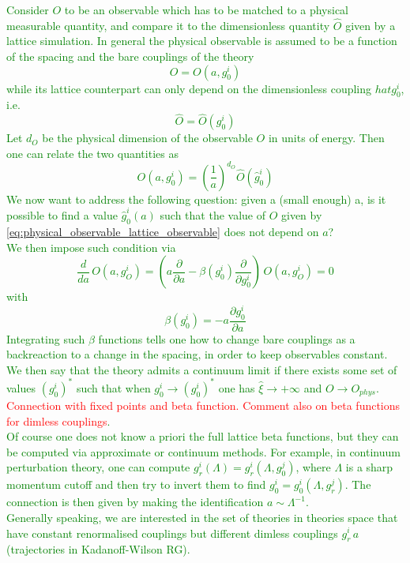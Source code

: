 \textcolor{green}{Consider $O$ to be an observable which has to be matched to a physical measurable quantity, and compare it to the dimensionless quantity $\hat O$ given by a lattice simulation. In general the physical observable is assumed to be a function of the spacing and the bare couplings of the theory 
\begin{equation*}
    O = O(a, g^i_0)
\end{equation*}
while its lattice counterpart can only depend on the dimensionless coupling $hat g_0^i$, i.e.
\begin{equation*}
    \hat O = \hat O(g_0^i)
\end{equation*}
Let $d_O$ be the physical dimension of the observable $O$ in units of energy. Then one can relate the two quantities as 
\begin{equation}
    O(a, g^i_0) = \left(\frac{1}{a}\right)^{d_O} \hat O(\hat g_0^i)
    \label{eq:physical_observable_lattice_observable}
\end{equation}
We now want to address the following question: given a (small enough) a, is it possible to find a value $\hat g_0^i(a)$ such that the value of $O$ given by \eqref{eq:physical_observable_lattice_observable} does not depend on $a$? \\
We then impose such condition via 
\begin{equation*}
    \frac{d}{da} \, O(a, g^i_O) = \left(a\frac{\partial}{\partial a} - \beta(g_0^i) \frac{\partial}{\partial g_0^i}\right) \, O(a, g^i_O) = 0
\end{equation*}
with
\begin{equation*}
    \beta(g_0^i) = - a \frac{\partial g_0^i}{\partial a}
\end{equation*}
Integrating such $\beta$ functions tells one how to change bare couplings as a backreaction to a change in the spacing, in order to keep observables constant. We then say that the theory admits a continuum limit if there exists some set of values $(g_0^i)^*$ such that when $g_0^i \to (g_0^i)^*$ one has $\hat \xi \to +\infty$ and $O \to O_{phys}$. \textcolor{red}{Connection with fixed points and beta function. Comment also on beta functions for dimless couplings}. \\
Of course one does not know a priori the full lattice beta functions, but they can be computed via approximate or continuum methods. For example, in continuum perturbation theory, one can compute $g_r^i(\Lambda) = g_r^i(\Lambda, g_0^j)$, where $\Lambda$ is a sharp momentum cutoff and then try to invert them to find $g_0^i = g_0^i(\Lambda, g_r^j)$. The connection is then given by making the identification $a \sim \Lambda^{-1}$. \\
Generally speaking, we are interested in the set of theories in theories space that have constant renormalised couplings but different dimless couplings $g_r^i \, a$ (trajectories in Kadanoff-Wilson RG).}
